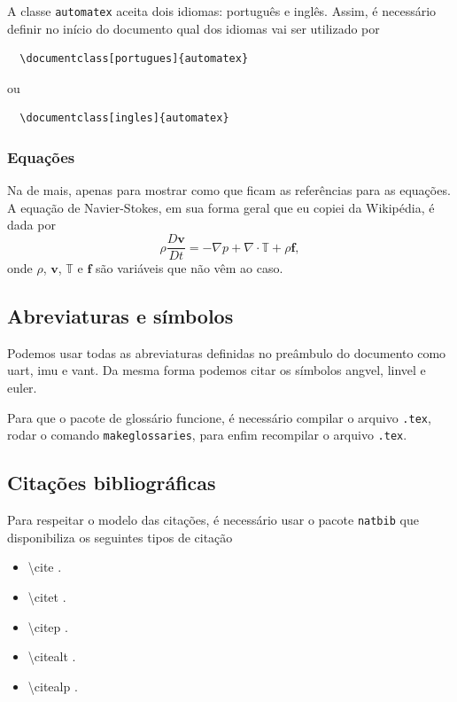 \documentclass[portugues]{automatex}
\begin{document}
A classe \verb+automatex+ aceita dois idiomas: português e inglês. Assim, é necessário definir no início do documento qual dos idiomas vai ser utilizado por
\begin{verbatim}
  \documentclass[portugues]{automatex}
\end{verbatim}
ou
\begin{verbatim}
  \documentclass[ingles]{automatex}
\end{verbatim}

\subsubsection{Equações}

Na de mais, apenas para mostrar como que ficam as referências para as equações. A equação de Navier-Stokes, em sua forma geral que eu copiei da Wikipédia, é dada por
\begin{equation}
  \rho\frac{D\mathbf{v}}{D t} = -\nabla p + \nabla \cdot\mathbb{T} + \rho\mathbf{f},
  \label{eq:navier-stokes}
\end{equation}
onde $\rho$, $\mathbf{v}$, $\mathbb{T}$ e $\mathbf{f}$ são variáveis que não vêm ao caso.

\subsection{Abreviaturas e símbolos}

Podemos usar todas as abreviaturas definidas no preâmbulo do documento como \gls{uart}, \gls{imu} e \gls{vant}. Da mesma forma podemos citar os símbolos \gls{angvel}, \gls{linvel} e \gls{euler}.

Para que o pacote de glossário funcione, é necessário compilar o arquivo \verb+.tex+, rodar o comando \verb+makeglossaries+, para enfim recompilar o arquivo \verb+.tex+.

\subsection{Citações bibliográficas}

Para respeitar o modelo das citações, é necessário usar o pacote \verb+natbib+ que disponibiliza os seguintes tipos de citação
\begin{itemize}
  \item \textbackslash{cite} \cite{small}.
  \item \textbackslash{citet} \citet{small}.
  \item \textbackslash{citep} \citep{small}.
  \item \textbackslash{citealt} \citealt{small}.
  \item \textbackslash{citealp} \citealp{small}.
\end{itemize}
\end{document}
